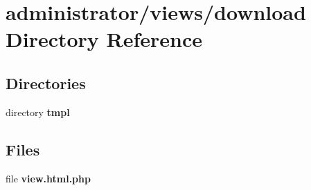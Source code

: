 \section{administrator/views/download Directory Reference}
\label{dir_4b2431c230b47a78e4c380a44417804b}
\subsection*{Directories}
\begin{DoxyCompactItemize}
\item 
directory \textbf{ tmpl}
\end{DoxyCompactItemize}
\subsection*{Files}
\begin{DoxyCompactItemize}
\item 
file \textbf{ view.\+html.\+php}
\end{DoxyCompactItemize}
